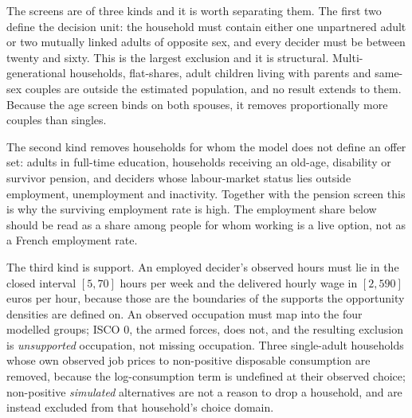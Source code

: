 The screens are of three kinds and it is worth separating them. The first two define the decision unit: the household must contain either one unpartnered adult or two mutually linked adults of opposite sex, and every decider must be between twenty and sixty. This is the largest exclusion and it is structural. Multi-generational households, flat-shares, adult children living with parents and same-sex couples are outside the estimated population, and no result extends to them. Because the age screen binds on both spouses, it removes proportionally more couples than singles.

The second kind removes households for whom the model does not define an offer set: adults in full-time education, households receiving an old-age, disability or survivor pension, and deciders whose labour-market status lies outside employment, unemployment and inactivity. Together with the pension screen this is why the surviving employment rate is high. The employment share below should be read as a share among people for whom working is a live option, not as a French employment rate.

The third kind is support. An employed decider's observed hours must lie in the closed interval \([5, 70]\) hours per week and the delivered hourly wage in \([2, 590]\) euros per hour, because those are the boundaries of the supports the opportunity densities are defined on. An observed occupation must map into the four modelled groups; ISCO 0, the armed forces, does not, and the resulting exclusion is \emph{unsupported} occupation, not missing occupation. Three single-adult households whose own observed job prices to non-positive disposable consumption are removed, because the log-consumption term is undefined at their observed choice; non-positive \emph{simulated} alternatives are not a reason to drop a household, and are instead excluded from that household's choice domain.

